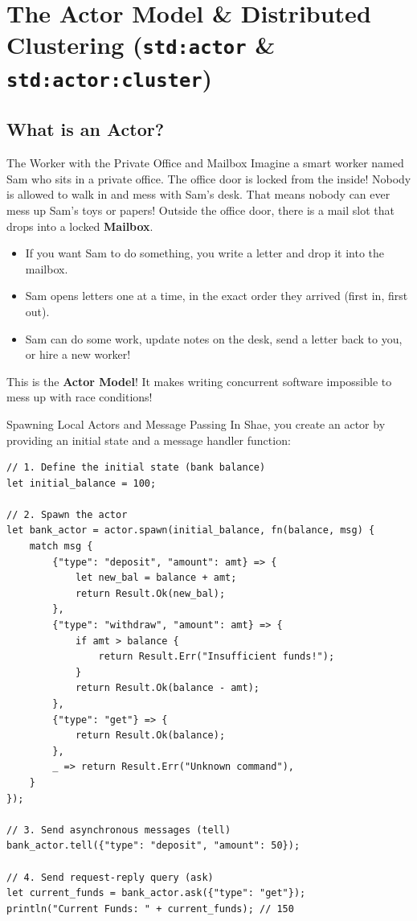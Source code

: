 \chapter{The Actor Model \& Distributed Clustering (\texttt{std:actor} \& \texttt{std:actor:cluster})}

\section{What is an Actor?}

\begin{kidbox}{The Worker with the Private Office and Mailbox}
Imagine a smart worker named Sam who sits in a private office.
The office door is locked from the inside! Nobody is allowed to walk in and mess with Sam's desk. That means nobody can ever mess up Sam's toys or papers!
Outside the office door, there is a mail slot that drops into a locked \textbf{Mailbox}.
\begin{itemize}
    \item If you want Sam to do something, you write a letter and drop it into the mailbox.
    \item Sam opens letters one at a time, in the exact order they arrived (first in, first out).
    \item Sam can do some work, update notes on the desk, send a letter back to you, or hire a new worker!
\end{itemize}
This is the \textbf{Actor Model}! It makes writing concurrent software impossible to mess up with race conditions!
\end{kidbox}

\begin{syntaxbox}{Spawning Local Actors and Message Passing}
In Shae, you create an actor by providing an initial state and a message handler function:
\begin{lstlisting}[language=shaelang]
// 1. Define the initial state (bank balance)
let initial_balance = 100;

// 2. Spawn the actor
let bank_actor = actor.spawn(initial_balance, fn(balance, msg) {
    match msg {
        {"type": "deposit", "amount": amt} => {
            let new_bal = balance + amt;
            return Result.Ok(new_bal);
        },
        {"type": "withdraw", "amount": amt} => {
            if amt > balance {
                return Result.Err("Insufficient funds!");
            }
            return Result.Ok(balance - amt);
        },
        {"type": "get"} => {
            return Result.Ok(balance);
        },
        _ => return Result.Err("Unknown command"),
    }
});

// 3. Send asynchronous messages (tell)
bank_actor.tell({"type": "deposit", "amount": 50});

// 4. Send request-reply query (ask)
let current_funds = bank_actor.ask({"type": "get"});
println("Current Funds: " + current_funds); // 150
\end{lstlisting}
\end{syntaxbox}

